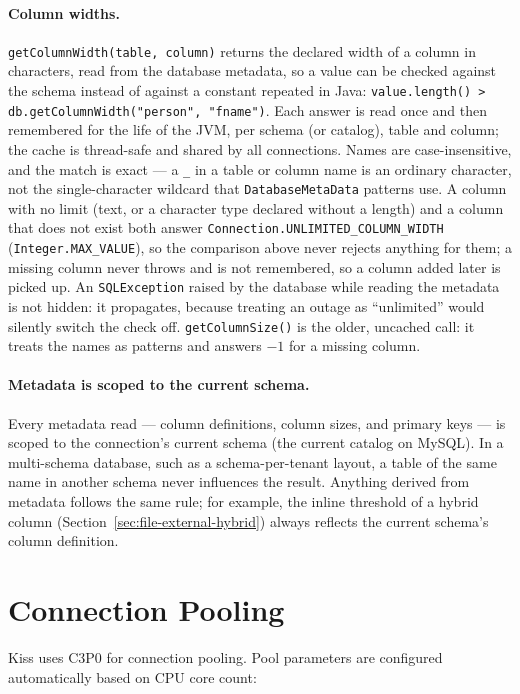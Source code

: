 \paragraph{Column widths.} \texttt{getColumnWidth(table, column)} returns the declared width of a column in characters, read from the database metadata, so a value can be checked against the schema instead of against a constant repeated in Java: \texttt{value.length() > db.getColumnWidth("person", "fname")}.  Each answer is read once and then remembered for the life of the JVM, per schema (or catalog), table and column; the cache is thread-safe and shared by all connections.  Names are case-insensitive, and the match is exact --- a \texttt{\_} in a table or column name is an ordinary character, not the single-character wildcard that \texttt{DatabaseMetaData} patterns use.  A column with no limit (text, or a character type declared without a length) and a column that does not exist both answer \texttt{Connection.UNLIMITED\_COLUMN\_WIDTH} (\texttt{Integer.MAX\_VALUE}), so the comparison above never rejects anything for them; a missing column never throws and is not remembered, so a column added later is picked up.  An \texttt{SQLException} raised by the database while reading the metadata is not hidden: it propagates, because treating an outage as ``unlimited'' would silently switch the check off.  \texttt{getColumnSize()} is the older, uncached call: it treats the names as patterns and answers $-1$ for a missing column.

\paragraph{Metadata is scoped to the current schema.} Every metadata read --- column definitions, column sizes, and primary keys --- is scoped to the connection's current schema (the current catalog on MySQL). In a multi-schema database, such as a schema-per-tenant layout, a table of the same name in another schema never influences the result. Anything derived from metadata follows the same rule; for example, the inline threshold of a hybrid column (Section~\ref{sec:file-external-hybrid}) always reflects the current schema's column definition.

\section{Connection Pooling}
\label{sec:db-pooling}

Kiss uses C3P0 for connection pooling.  Pool parameters are configured automatically based on CPU core count:

